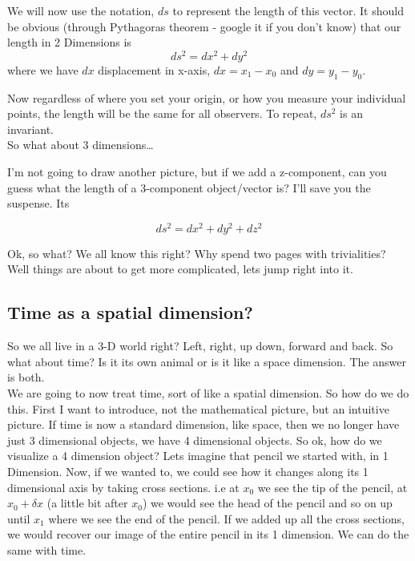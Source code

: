 We will now use the notation, $ds$ to represent the length of this vector. It should be obvious (through Pythagoras theorem - google it if you don't know) that our length in 2 Dimensions is
\begin{equation}
  ds^2 = dx^2 + dy^2
\end{equation}
where we have $dx$ displacement in x-axis, $dx = x_1 - x_0$ and $dy = y_1 - y_0$.  

Now regardless of where you set your origin, or how you measure your individual points, the length will be the same for all observers. To repeat, $ds^2$ is an invariant. \\

So what about 3 dimensions\ldots 

I'm not going to draw another picture, but if we add a z-component, can you guess what the length of a 3-component object/vector is? I'll save you the suspense. Its

\begin{equation}
  ds^2 = dx^2 + dy^2 + dz^2
\end{equation}

Ok, so what? We all know this right? Why spend two pages with trivialities? Well things are about to get more complicated, lets jump right into it. 

\subsection{Time as a spatial dimension?}

So we all live in a 3-D world right? Left, right, up down, forward and back. So what about time? Is it its own animal or is it like a space dimension. The answer is both. \\

We are going to now treat time, sort of like a spatial dimension. So how do we do this. First I want to introduce, not the mathematical picture, but an intuitive picture. If time is now a standard dimension, like space, then we no longer have just 3 dimensional objects, we have 4 dimensional objects. So ok, how do we visualize a 4 dimension object? Lets imagine that pencil we started with, in 1 Dimension. Now, if we wanted to, we could see how it changes along its 1 dimensional axis by taking cross sections. i.e at $x_0$ we see the tip of the pencil, at $x_0+ \delta x$ (a little bit after $x_0$) we would see the head of the pencil and so on up until $x_1$ where we see the end of the pencil. If we added up all the cross sections, we would recover our image of the entire pencil in its 1 dimension. We can do the same with time. 


